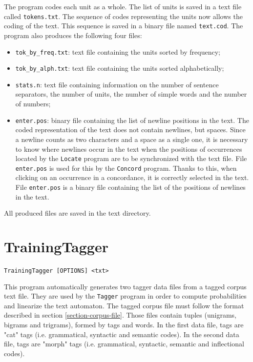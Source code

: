 \bigskip
\noindent The program codes each unit as a whole. The list of units is saved in a text file
called \verb+tokens.txt+. The sequence of codes representing the units now allows
the coding of the text. This sequence is saved in a binary file named
\verb+text.cod+. The program also produces the following four files:

\begin{itemize}
  \item \verb+tok_by_freq.txt+: text file containing the units sorted by frequency;
  \item \verb+tok_by_alph.txt+: text file containing the units sorted alphabetically;
  \item \verb+stats.n+: text file containing information on the number of
  sentence separators, the number of units, the number of simple words and the
  number of numbers;

  \item \verb+enter.pos+: binary file containing the list of newline positions in
  the text. The coded representation of the text does not contain newlines, but
  spaces. Since a newline counts as two characters and a space as a single one,
  it is necessary to know where newlines occur in the text when the positions of
  occurrences located by the \verb+Locate+ program are to be synchronized with
  the text file. File \verb+enter.pos+ is used for this by the \verb+Concord+
  program. Thanks to this, when clicking on an occurrence in a concordance, it is
  correctly selected in the text. File \verb$enter.pos$ is a binary file
  containing the list of the positions of newlines in the text.

\end{itemize}

\bigskip
\noindent All produced files are saved in the text directory.






\section{TrainingTagger}
\verb+TrainingTagger [OPTIONS] <txt>+
\label{section-TrainingTagger}

\bigskip
\noindent {}This 
program automatically generates two tagger data files from a tagged corpus text file. They are used by the \verb+Tagger+ program 
in order to compute probabilities and linearize the text automaton. The tagged corpus file must follow the format described 
in section \ref{section-corpus-file}. Those files contain tuples (unigrams, bigrams and trigrams), 
formed by tags and words. In the first data file, tags are "cat" tags (i.e. grammatical, syntactic and semantic codes). 
In the second data file, tags are "morph" tags (i.e. grammatical, syntactic, semantic and inflectional codes). 

